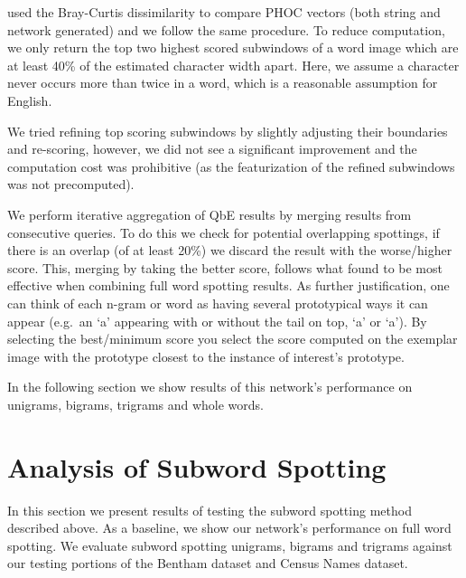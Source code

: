 \documentclass[ms,electronic,twosidetoc,letterpaper,chaptercenter,parttop,lol,lof,lot]{byumsphd}
\begin{document}
\cite{sudholt2016} used the Bray-Curtis dissimilarity to compare PHOC vectors (both string and network generated) and we follow the same procedure.
To reduce computation, we only return the top two highest scored subwindows of a word image which are at least 40\% of the estimated character width apart. Here, we assume a character never occurs more than twice in a word, which is a reasonable assumption for English.


We tried refining top scoring subwindows by slightly adjusting their boundaries and re-scoring, however, we did not see a significant improvement and the computation cost was prohibitive (as the featurization of the refined subwindows was not precomputed).

We perform iterative aggregation of QbE results by merging results from consecutive queries. To do this we check for potential overlapping spottings, if there is an overlap (of at least 20\%) we discard the result with the worse/higher score. This, merging by taking the better score, follows what \cite{Zagoris2015} found to be most effective when combining full word spotting results. As further justification, one can think of each n-gram or word as having several prototypical ways it can appear (e.g.~an `a' appearing with or without the tail on top, `\textsf{a}' or `{\selectfont\footnotesize a}'). By selecting the best/minimum score you select the score computed on the exemplar image with the prototype closest to the instance of interest's prototype.

In the following section we show results of this network's performance on unigrams, bigrams, trigrams and whole words.


\section{Analysis of Subword Spotting}

In this section we present results of testing the subword spotting method described above.
As a baseline, we show our network's performance on full word spotting. We evaluate subword spotting unigrams, bigrams and trigrams against our testing portions of the Bentham dataset and Census Names dataset. 
\end{document}

